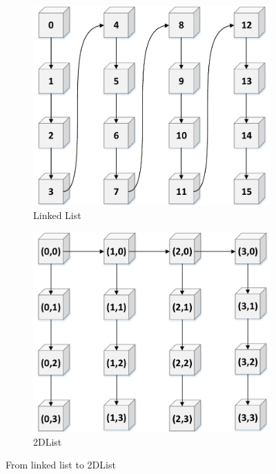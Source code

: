 \documentclass[10pt,journal,letter,compsoc]{IEEEtran}
\begin{document}
\vspace{-0.05in}
\begin{figure}[h]
    \begin{subfigure}{0.48\columnwidth}
        \centering
        \includegraphics[width=1\columnwidth]{./graph/mdlist-1d}
        \caption{Linked List}
        \label{fig:mdlist1d}
    \end{subfigure}
    \hfill
    \begin{subfigure}{0.48\columnwidth}
        \centering
        \includegraphics[width=1\columnwidth]{./graph/mdlist-2d}
        \caption{2DList}
        \label{fig:mdlist2d}
    \end{subfigure}
    \caption{From linked list to 2DList}
    \label{fig:mdlist}
\end{figure}
\vspace{-0.1in}
\end{document}
